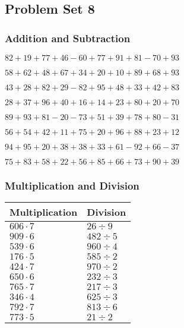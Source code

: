 \hypertarget{problem-set-8}{%
\subsection{Problem Set 8}\label{problem-set-8}}

\hypertarget{addition-and-subtraction}{%
\subsubsection{Addition and
Subtraction}\label{addition-and-subtraction}}

\(82+19+77+46-60+77+91+81-70+93\)

\(58+62+48+67+34+20+10+89+68+93\)

\(43+28+82+29-82+95+48+33+42+83\)

\(28+37+96+40+16+14+23+80+20+70\)

\(89+93+81-20-73+51+39+78+80-31\)

\(56+54+42+11+75+20+96+88+23+12\)

\(94+95+20+38+38+33+61-92+66-37\)

\(75+83+58+22+56+85+66+73+90+39\)

\hypertarget{multiplication-and-division}{%
\subsubsection{Multiplication and
Division}\label{multiplication-and-division}}

\begin{longtable}[]{@{}ll@{}}
\toprule
Multiplication & Division\tabularnewline
\midrule
\endhead
\(606\cdot7\) & \(26÷9\)\tabularnewline
\(909\cdot6\) & \(482÷5\)\tabularnewline
\(539\cdot6\) & \(960÷4\)\tabularnewline
\(176\cdot5\) & \(585÷2\)\tabularnewline
\(424\cdot7\) & \(970÷2\)\tabularnewline
\(650\cdot6\) & \(232÷3\)\tabularnewline
\(765\cdot7\) & \(217÷3\)\tabularnewline
\(346\cdot4\) & \(625÷3\)\tabularnewline
\(792\cdot7\) & \(813÷6\)\tabularnewline
\(773\cdot5\) & \(21÷2\)\tabularnewline
\bottomrule
\end{longtable}
